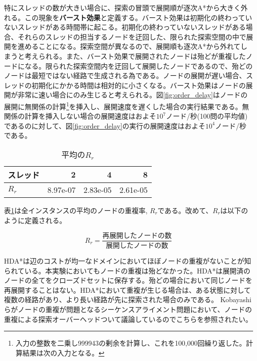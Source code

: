 \documentclass[uplatex]{jsarticle}
\begin{document}
特にスレッドの数が大きい場合に、探索の冒頭で展開順が逐次A*から大きく外れる。この現象を\textbf{バースト効果}と定義する。バースト効果は初期化の終わっていないスレッドがある時間帯に起こる。初期化の終わっていないスレッドがある場合、それらのスレッドの担当するノードを迂回した、限られた探索空間の中で展開を進めることになる。探索空間が異なるので、展開順も逐次A*から外れてしまうと考えられる。また、バースト効果で展開されたノードは殆どが重複したノードになる。限られた探索空間内を迂回して展開したノードであるので、殆どのノードは最短ではない経路で生成される為である。ノードの展開が遅い場合、スレッドの初期化にかかる時間は相対的に小さくなる。バースト効果はノードの展開が非常に速い場合にのみ生じると考えられる。図\ref{fig:order_delay}はノードの展開に無関係の計算\footnote{入力の整数を二乗し999943の剰余を計算し、これを100,000回繰り返した。計算結果は次の入力となる。}を挿入し、展開速度を遅くした場合の実行結果である。無関係の計算を挿入しない場合の展開速度はおよそ$10^7$ノード/秒(100問の平均値)であるのに対して、図\ref{fig:order_delay}の実行の展開速度はおよそ$10^4$ノード/秒である。


\begin{table}[h]
	\centering
	\begin{tabular}{lrrr} \hline
		スレッド  & 2 & 4 & 8 \\ \hline
		$R_{r}$ & 8.97e-07 & 2.83e-05 & 2.61e-05 \\ \hline
	\end{tabular}
	\caption{平均の$R_{r}$}
	\label{hdastar_duplication}
\end{table}


表\ref{hdastar_duplication}は全インスタンスの平均のノードの重複率, $R_{r}$である。改めて、$R_{r}$は以下のように定義される。

\begin{equation}
	R_{r} = \frac{再展開したノードの数}{展開したノードの数}
\end{equation}
\newline

HDA*は辺のコストが均一なドメインにおいてほぼノードの重複がないことが知られている\cite{Kishimoto2013}。本実験においてもノードの重複は殆どなかった。HDA*は展開済のノードの全てをクローズドセットに保存する。殆どの場合において同じノードを再展開することはない。HDA*において重複が生じる場合は、ある状態に対して複数の経路があり、より長い経路が先に探索された場合のみである。%
Kobayashiらがノードの重複が問題となるシーケンスアライメント問題において、ノードの重複による探索オーバーヘッドついて議論しているのでこちらを参照されたい\cite{kobayashi2011evaluations}。
\end{document}

